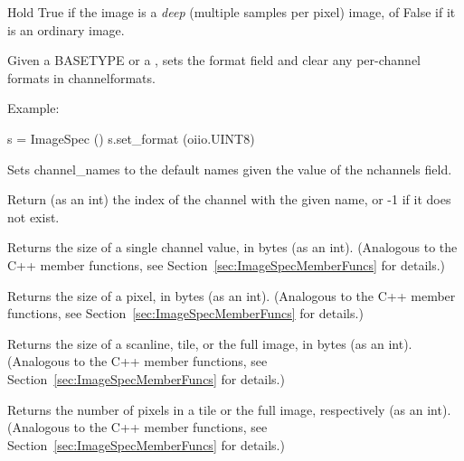 Hold {\cf True} if the image is a \emph{deep} (multiple samples per pixel)
image, of {\cf False} if it is an ordinary image.
\apiend

Given a {\cf BASETYPE} or a \TypeDesc, sets the {\cf format} field and
clear any per-channel formats in {\cf channelformats}.

\noindent Example:
\begin{code}
    s = ImageSpec ()
    s.set_format (oiio.UINT8)
\end{code}
\apiend

Sets {\cf channel_names} to the default names given the value of
the {\cf nchannels} field.
\apiend

\NEW %
Return (as an int) the index of the channel with the given name, or -1
if it does not exist.
\apiend

Returns the size of a single channel value, in bytes (as an
{\cf int}).
(Analogous to the C++ member functions, see 
Section~\ref{sec:ImageSpecMemberFuncs} for details.)
\apiend

Returns the size of a pixel, in bytes (as an {\cf int}).
(Analogous to the C++ member functions, see 
Section~\ref{sec:ImageSpecMemberFuncs} for details.)
\apiend

Returns the size of a scanline, tile, or the full image, in bytes (as an
{\cf int}). (Analogous to the C++ member functions, see 
Section~\ref{sec:ImageSpecMemberFuncs} for details.)
\apiend

Returns the number of pixels in a tile or the full image, respectively
(as an {\cf int}). (Analogous to the C++ member functions, see 
Section~\ref{sec:ImageSpecMemberFuncs} for details.)
\apiend

